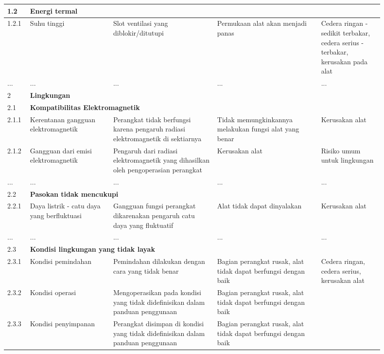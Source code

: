 \documentclass[11pt,a4paper,twoside,onecolumn]{book}
\begin{document}
\begin{longtable}{p{0.05\linewidth} p{0.20\linewidth} p{0.25\linewidth} p{0.25\linewidth} p{0.15\linewidth}}
				
				1.2 & \multicolumn{4}{l}{\textbf{Energi termal}} \\
				\hline
				1.2.1 & Suhu tinggi & Slot ventilasi yang diblokir/ditutupi & Permukaan alat akan menjadi panas & Cedera ringan - sedikit terbakar, cedera serius - terbakar, kerusakan pada alat \\ \cline{1-5}
				... & ... & ... & ... & ... \\ \cline{1-5}
								
				\hline
				\hline
				\hline
				\cellcolor{cyan}2 & \multicolumn{4}{l}{\textbf{Lingkungan} \cellcolor{cyan}} \\
				\hline
				2.1 & \multicolumn{4}{l}{\textbf{Kompatibilitas Elektromagnetik}} \\
				\hline
				2.1.1 & Kerentanan gangguan elektromagnetik & Perangkat tidak berfungsi karena pengaruh radiasi elektromagnetik di sektiarnya & Tidak memungkinkannya melakukan fungsi alat yang benar & Kerusakan alat \\
				\hline
				2.1.2 & Gangguan dari emisi elektromagnetik & Pengaruh   dari radiasi elektromagnetik yang dihasilkan oleh pengoperasian perangkat & Kerusakan alat  & Risiko umum untuk 
				lingkungan \\ \cline{1-5}
				\hline
				... & ... & ... & ... & ... \\ \cline{1-5}
				\hline
				\hline
				2.2 & \multicolumn{4}{l}{\textbf{Pasokan tidak mencukupi}} \\
				\hline
				2.2.1 & Daya listrik - catu daya yang berfluktuasi & Gangguan fungsi perangkat dikarenakan 
				pengaruh catu daya yang fluktuatif & Alat tidak dapat dinyalakan & Kerusakan alat  \\
				\hline
				... & ... & ... & ... & ... \\ \cline{1-5}
				\hline
				\hline
				2.3 & \multicolumn{4}{l}{\textbf{Kondisi lingkungan yang tidak layak}} \\
				\hline
				2.3.1 & Kondisi pemindahan & Pemindahan dilakukan dengan cara yang tidak benar  & Bagian perangkat rusak, alat tidak dapat berfungsi dengan baik  & \multirow{5}{\linewidth}{Cedera ringan, cedera serius, kerusakan alat} \\
				\cline{1-4}
				2.3.2 & Kondisi operasi & Mengoperasikan pada kondisi yang tidak didefinisikan dalam panduan penggunaan  & Bagian perangkat rusak, alat tidak dapat berfungsi dengan baik  &  \\
				\cline{1-4}
				2.3.3 & Kondisi penyimpanan & Perangkat disimpan di kondisi yang tidak didefinisikan dalam panduan penggunaan  & Bagian perangkat rusak, alat tidak dapat berfungsi dengan baik &  \\

\end{longtable}
\end{document}
